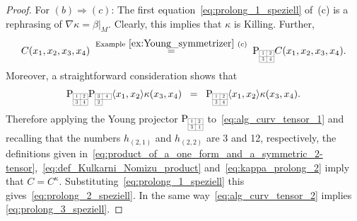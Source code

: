 \documentclass[11pt,a4paper]{article}
\theoremstyle{plain}
\theoremstyle{remark}
\newcommand{\rmP}{\mathrm{P}}
\begin{document}
\begin{proof}
For $(b)\Rightarrow (c)$: The first equation~\eqref{eq:prolong_1_speziell} of~(c) is a rephrasing of $\nabla\kappa = \beta|_M$. 
Clearly, this implies that $\kappa$ is Killing. Further, 
\[
C(x_1,x_2,x_3,x_4)  \;\stackrel{\text{Example}~\ref{ex:Young_symmetrizer}~\text{(c)}}{=}\; \rmP_{\scaleto{\begin{array}{|c|c|}
\cline{1-2}
1 & 2 \\
\cline{1-2}
3 & 4\\
\cline{1-2} 
\end{array}}{12pt}} C(x_1,x_2,x_3,x_4).
\] 
Moreover, a straightforward consideration shows that
\begin{align*}
\rmP_{\scaleto{\begin{array}{|c|c|}
\cline{1-2}
1 & 2 \\
\cline{1-2}
3 & 4\\
\cline{1-2} 
\end{array}}{12pt}} \rmP_{\scaleto{\begin{array}{|c|c|}
\cline{1-2}
3 & 4 \\
\cline{1-2}
2 &  \multicolumn{1}{c}{\;\;\;} \\
\cline{1-1}  
\end{array}}{12pt}} \langle x_1, x_2\rangle \kappa(x_3,x_4)\;\;=\;\;\rmP_{\scaleto{\begin{array}{|c|c|}
\cline{1-2}
1 & 2 \\
\cline{1-2}
3 & 4\\
\cline{1-2} 
\end{array}}{12pt}} \langle x_1, x_2\rangle \kappa(x_3,x_4).
\end{align*}
Therefore applying the Young projector $\rmP_{\scaleto{\begin{array}{|c|c|}
\cline{1-2}
1 & 2 \\
\cline{1-2}
3 & 4\\
\cline{1-2} 
\end{array}}{12pt}}$ to~\eqref{eq:alg_curv_tensor_1} and recalling that the
numbers $h_{(2,1)}$ and $h_{(2,2)}$ are 3 and 12, respectively, the
definitions given in~\eqref{eq:product_of_a_one_form_and_a_symmetric_2-tensor},~\eqref{eq:def_Kulkarni_Nomizu_product}
and~\eqref{eq:kappa_prolong_2} imply that $C = C^\kappa$. Substituting~\eqref{eq:prolong_1_speziell} this
gives~\eqref{eq:prolong_2_speziell}. In the same way~\eqref{eq:alg_curv_tensor_2}
implies \eqref{eq:prolong_3_speziell}.


\end{proof}
\end{document}
